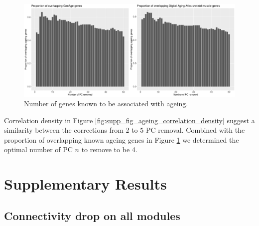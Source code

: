 \begin{figure}[ht]
    \includegraphics[width=\textwidth, center]{img/annexe_add_file_GWENA/additional_file_figure_3.pdf}
    \caption{Number of genes known to be associated with ageing.}
    \label{fig:supp_fig_ageing_genes_overlapping}
\end{figure}

Correlation density in Figure \ref{fig:supp_fig_ageing_correlation_density} suggest a similarity between the corrections from 2 to 5 PC removal. Combined with the proportion of overlapping known ageing genes in Figure \ref{fig:supp_fig_ageing_genes_overlapping} we determined the optimal number of PC $n$ to remove to be 4.

\clearpage
\section{Supplementary Results}
\subsection{Connectivity drop on all modules}
\label{supp:supp_connectivity_drop}

\begin{figure}[hb]
\end{figure}

